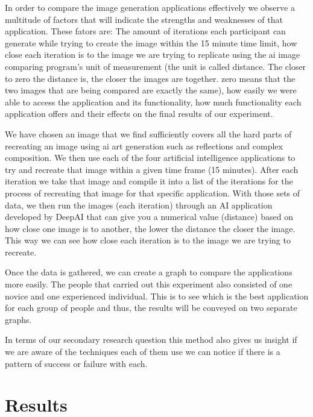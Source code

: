 \documentclass[]{report}
\begin{document}
	In order to compare the image generation applications effectively we observe a multitude of factors that will indicate the strengths and weaknesses of that application. These fators are: The amount of iterations each participant can generate while trying to create the image within the 15 minute time limit, how close each iteration is to the image we are trying to replicate using the ai image comparing program's unit of measurement (the unit is called distance. The closer to zero the distance is, the closer the images are together. zero means that the two images that are being compared are exactly the same), how easily we were able to access the application and its functionality, how much functionality each application offers and their effects on the final results of our experiment.
	
	
	We have chosen an image that we find sufficiently covers all the hard parts of recreating an image using ai art generation such as reflections and complex composition. We then use each of the four artificial intelligence applications to try and recreate that image within a given time frame (15 minutes). After each iteration we take that image and compile it into a list of the iterations for the process of recreating that image for that specific application. With those sets of data, we then run the images (each iteration) through an AI application developed by DeepAI that can give you a numerical value (distance) based on how close one image is to another, the lower the distance the closer the image. This way we can see how close each iteration is to the image we are trying to recreate.
	
	Once the data is gathered, we can create a graph to compare the applications more easily. The people that carried out this experiment also consisted of one novice and one experienced individual. This is to see which is the best application for each group of people and thus, the results will be conveyed on two separate graphs.
	
	In terms of our secondary research question this method also gives us insight if we are aware of the techniques each of them use we can notice if there is a pattern of success or failure with each.
	
	
	
	\section{Results}
\end{document}
